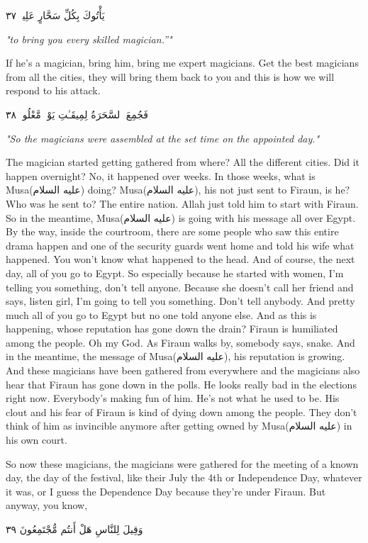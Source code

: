 \documentclass[12pt]{article}
\newcommand{\as}{\textarabic{(عليه السلام)}}
\begin{document}
\textarabic{يَأْتُوكَ بِكُلِّ سَحَّارٍ عَلِيمٍۢ ٣٧}

\textit{"to bring you every skilled magician.”"}


If he's a magician, bring him, bring me expert magicians. Get the best magicians from all the cities, they will bring them back to you and this is how we will respond to his attack. 

\textarabic{فَجُمِعَ ٱلسَّحَرَةُ لِمِيقَـٰتِ يَوْمٍۢ مَّعْلُومٍۢ ٣٨}

\textit{"So the magicians were assembled at the set time on the appointed day."}

The magician started getting gathered from where? All the different cities. Did it happen overnight? No, it happened over weeks. In those weeks, what is Musa\as{} doing? Musa\as{}, his not just sent to Firaun, is he? Who was he sent to? The entire nation. Allah just told him to start with Firaun. So in the meantime, Musa\as{} is going with his message all over Egypt. By the way, inside the courtroom, there are some people who saw this entire drama happen and one of the security guards went home and told his wife what happened. You won't know what happened to the head. And of course, the next day, all of you go to Egypt. So especially because he started with women, I'm telling you something, don't tell anyone. Because she doesn't call her friend and says, listen girl, I'm going to tell you something. Don't tell anybody. And pretty much all of you go to Egypt but no one told anyone else. And as this is happening, whose reputation has gone down the drain? Firaun is humiliated among the people. Oh my God. As Firaun walks by, somebody says, snake. And in the meantime, the message of Musa\as{}, his reputation is growing. And these magicians have been gathered from everywhere and the magicians also hear that Firaun has gone down in the polls. He looks really bad in the elections right now. Everybody's making fun of him. He's not what he used to be. His clout and his fear of Firaun is kind of dying down among the people. They don't think of him as invincible anymore after getting owned by Musa\as{} in his own court. 

So now these magicians, the magicians were gathered for the meeting of a known day, the day of the festival, like their July the 4th or Independence Day, whatever it was, or I guess the Dependence Day because they're under Firaun. But anyway, you know, 

\textarabic{وَقِيلَ لِلنَّاسِ هَلْ أَنتُم مُّجْتَمِعُونَ ٣٩}
\end{document}
